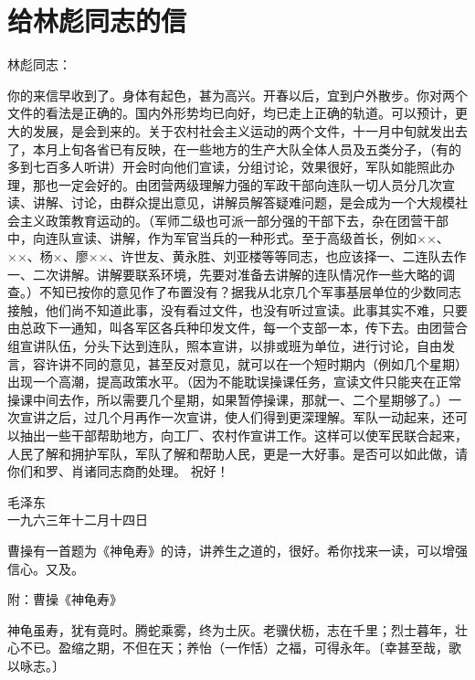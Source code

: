 \section[给林彪同志的信（一九六三年十二月十四日）]{给林彪同志的信}


林彪同志：

你的来信早收到了。身体有起色，甚为高兴。开春以后，宜到户外散步。你对两个文件的看法是正确的。国内外形势均已向好，均已走上正确的轨道。可以预计，更大的发展，是会到来的。关于农村社会主义运动的两个文件，十一月中旬就发出去了，本月上旬各省已有反映，在一些地方的生产大队全体人员及五类分子，（有的多到七百多人听讲）开会时向他们宣读，分组讨论，效果很好，军队如能照此办理，那也一定会好的。由团营两级理解力强的军政干部向连队一切人员分几次宣读、讲解、讨论，由群众提出意见，讲解员解答疑难问题，是会成为一个大规模社会主义政策教育运动的。（军师二级也可派一部分强的干部下去，杂在团营干部中，向连队宣读、讲解，作为军官当兵的一种形式。至于高级首长，例如××、××、杨×、廖××、许世友、黄永胜、刘亚楼等等同志，也应该择一、二连队去作一、二次讲解。讲解要联系环境，先要对准备去讲解的连队情况作一些大略的调查。）不知已按你的意见作了布置没有？据我从北京几个军事基层单位的少数同志接触，他们尚不知道此事，没有看过文件，也没有听过宣读。此事其实不难，只要由总政下一通知，叫各军区各兵种印发文件，每一个支部一本，传下去。由团营合组宣讲队伍，分头下达到连队，照本宣讲，以排或班为单位，进行讨论，自由发言，容许讲不同的意见，甚至反对意见，就可以在一个短时期内（例如几个星期）出现一个高潮，提高政策水平。（因为不能耽误操课任务，宣读文件只能夹在正常操课中间去作，所以需要几个星期，如果暂停操课，那就一、二个星期够了。）一次宣讲之后，过几个月再作一次宣讲，使人们得到更深理解。军队一动起来，还可以抽出一些干部帮助地方，向工厂、农村作宣讲工作。这样可以使军民联合起来，人民了解和拥护军队，军队了解和帮助人民，更是一大好事。是否可以如此做，请你们和罗、肖诸同志商酌处理。
祝好！

{\raggedleft 毛泽东\\一九六三年十二月十四日\par}

曹操有一首题为《神龟寿》的诗，讲养生之道的，很好。希你找来一读，可以增强信心。又及。

附：曹操《神龟寿》

神龟虽寿，犹有竟时。腾蛇乘雾，终为土灰。老骥伏枥，志在千里；烈士暮年，壮心不已。盈缩之期，不但在天；养怡（一作恬）之福，可得永年。〔幸甚至哉，歌以咏志。〕


